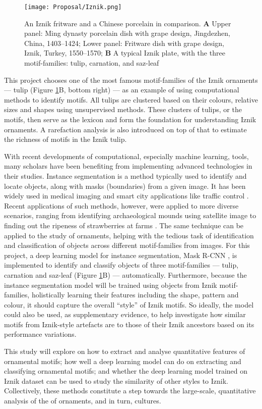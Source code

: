 \documentclass[11pt]{article}
\begin{document}
\begin{figure}[H]
\centering
\texttt{[image: Proposal/Iznik.png]}
\caption{An Iznik fritware and a Chinese porcelain in comparison. \textbf{A} Upper panel: Ming dynasty porcelain dish with grape design, Jingdezhen, China, 1403–1424; Lower panel: Fritware dish with grape design, Iznik, Turkey, 1550–1570; \textbf{B} A typical Iznik plate, with the three motif-families: tulip, carnation, and saz-leaf} 
\label{fig:Iznik_chinese}
\end{figure} 

This project chooses one of the most famous motif-families of the Iznik ornaments --- tulip (Figure \ref{fig:Iznik_chinese}B, bottom right) --- as an example of using computational methods to identify motifs. All tulips are clustered based on their colours, relative sizes and shapes using unsupervised methods. These clusters of tulips, or the motifs, then serve as the lexicon and form the foundation for understanding Iznik ornaments. A rarefaction analysis is also introduced on top of that to estimate the richness of motifs in the Iznik tulip. \par
With recent developments of computational, especially machine learning, tools, many scholars have been benefiting from implementing advanced technologies in their studies. Instance segmentation is a method typically used to identify and locate objects, along with masks (boundaries) from a given image. It has been widely used in medical imaging \parencite{pal1993review} and smart city applications like traffic control \parencite{shadeed2003road}. Recent applications of such methods, however, were applied to more diverse scenarios, ranging from identifying archaeological mounds using satellite image \parencite{orengo2020automated} to finding out the ripeness of strawberries at farms \parencite{yu2019fruit}. The same technique can be applied to the study of ornaments, helping with the tedious task of identification and classification of objects across different motif-families from images. For this project, a deep learning model for instance segmentation, Mask R-CNN \parencite{he2017mask}, is implemented to identify and classify objects of three motif-families --- tulip, carnation and saz-leaf (Figure \ref{fig:Iznik_chinese}B) --- automatically. 
Furthermore, because the instance segmentation model will be trained using objects from Iznik motif-families, holistically learning their features including the shape, pattern and colour, it should capture the overall ``style'' of Iznik motifs. So ideally, the model could also be used, as supplementary evidence, to help investigate how similar motifs from Iznik-style artefacts are to those of their Iznik ancestors based on its performance variations.\par
This study will explore on how to extract and analyse quantitative features of ornamental motifs; how well a deep learning model can do on extracting and classifying ornamental motifs; and whether the deep learning model trained on Iznik dataset can be used to study the similarity of other styles to Iznik. Collectively, these methods constitute a step towards the large-scale, quantitative analysis of the of ornaments, and in turn, cultures.\par
\end{document}
